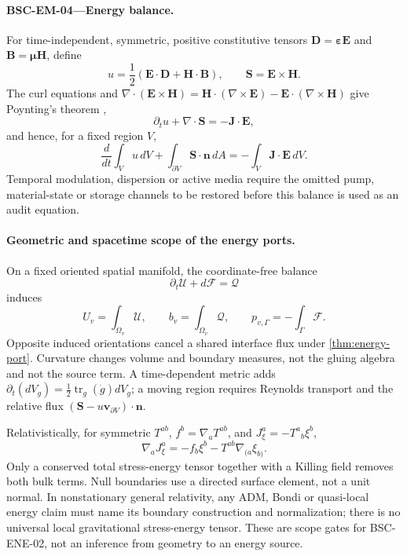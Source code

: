 \documentclass[11pt,a4paper]{article}
\theoremstyle{definition}
\theoremstyle{plain}
\theoremstyle{remark}
\begin{document}
\paragraph{\textbf{BSC-EM-04}---Energy balance.}
For time-independent, symmetric, positive constitutive tensors
\(\mathbf D=\boldsymbol\varepsilon\mathbf E\) and
\(\mathbf B=\boldsymbol\mu\mathbf H\), define
\[
u=\frac12(\mathbf E\mathbin{\cdot}\mathbf D+
          \mathbf H\mathbin{\cdot}\mathbf B),
\qquad
\mathbf S=\mathbf E\times\mathbf H.
\]
The curl equations and
\(\nabla\mathbin{\cdot}(\mathbf E\times\mathbf H)
 =\mathbf H\mathbin{\cdot}(\nabla\times\mathbf E)
 -\mathbf E\mathbin{\cdot}(\nabla\times\mathbf H)\)
give Poynting's theorem \citep{poynting1884},
\[
\partial_tu+\nabla\mathbin{\cdot}\mathbf S
  =-\mathbf J\mathbin{\cdot}\mathbf E,
\]
and hence, for a fixed region \(V\),
\[
\frac{d}{dt}\int_Vu\,dV+
\int_{\partial V}\mathbf S\mathbin{\cdot}\mathbf n\,dA
=-\int_V\mathbf J\mathbin{\cdot}\mathbf E\,dV.
\]
Temporal modulation, dispersion or active media require the omitted
pump, material-state or storage channels to be restored before this balance
is used as an audit equation.

\paragraph{Geometric and spacetime scope of the energy ports.}
On a fixed oriented spatial manifold, the coordinate-free balance
\[
\partial_t\mathcal U+d\mathcal F=\mathcal Q
\]
induces
\[
U_v=\int_{\Omega_v}\mathcal U,\qquad
b_v=\int_{\Omega_v}\mathcal Q,\qquad
p_{v,\Gamma}=-\int_\Gamma\mathcal F.
\]
Opposite induced orientations cancel a shared interface flux under
\cref{thm:energy-port}.  Curvature changes volume and boundary measures, not
the gluing algebra and not the source term.  A time-dependent metric adds
\(\partial_t(dV_g)=\tfrac12\operatorname{tr}_g(\dot g)dV_g\); a moving
region requires Reynolds transport and the relative flux
\((\mathbf S-u\mathbf v_{\partial V})\mathbin{\cdot}\mathbf n\).

Relativistically, for symmetric \(T^{ab}\),
\(f^b=\nabla_aT^{ab}\), and \(J_\xi^a=-T^a{}_b\xi^b\),
\[
\nabla_aJ_\xi^a
=-f_b\xi^b-T^{ab}\nabla_{(a}\xi_{b)}.
\]
Only a conserved total stress-energy tensor together with a Killing field
removes both bulk terms.  Null boundaries use a directed surface element,
not a unit normal.  In nonstationary general relativity, any ADM, Bondi or
quasi-local energy claim must name its boundary construction and
normalization; there is no universal local gravitational stress-energy
tensor.  These are scope gates for BSC-ENE-02, not an inference from geometry
to an energy source.
\end{document}
